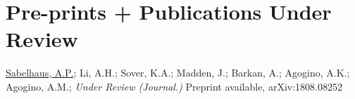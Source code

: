 \documentclass[letterpaper]{deedy-resume} %
\begin{document}
{%





  




\section{Pre-prints + Publications Under Review}

\vspace{0.2cm}

\begin{etaremune}

\item {} \underline{Sabelhaus, A.P.}; Li, A.H.; Sover, K.A.; Madden, J.; Barkan, A.; Agogino, A.K.; Agogino, A.M.; {\it Under Review (Journal.)} Preprint available, arXiv:1808.08252


\end{etaremune}}
\end{document}
